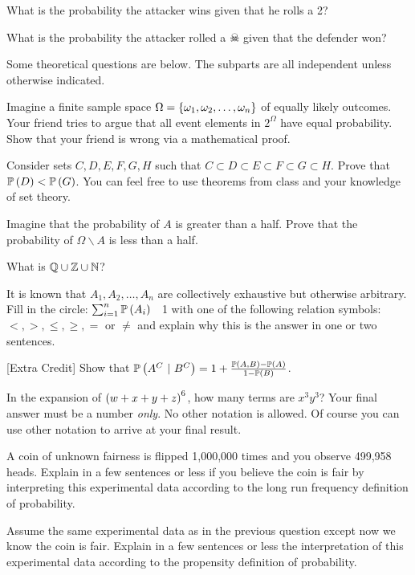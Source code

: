 \documentclass[12pt]{article}
\begin{document}
 What is the probability the attacker wins given that he rolls a 2? 

 What is the probability the attacker rolled a $\skull$ given that the defender won? 

\eenum

\problem Some theoretical questions are below. The subparts are all independent unless otherwise indicated.

\benum

  Imagine a finite sample space $\Omega = \left\{\omega_1, \omega_2, \ldots, \omega_n\right\}$ of equally likely outcomes. Your friend tries to argue that all event elements in $2^\Omega$ have equal probability. Show that your friend is wrong via a mathematical proof. 

  Consider sets $C, D, E, F, G, H$ such that $C \subset D \subset E \subset F \subset G \subset H$. Prove that $\mathbb{P}\left(D\right) < \mathbb{P}\left(G\right)$. You can feel free to use theorems from class and your knowledge of set theory. 

  Imagine that the probability of $A$ is greater than a half. Prove that the probability of $\Omega \backslash A$ is less than a half. 


  What is $\mathbb{Q} \cup \mathbb{Z} \cup \mathbb{N}$? 

 It is known that $A_1, A_2, \ldots, A_n$ are collectively exhaustive but otherwise arbitrary. Fill in the circle: $\sum_{i=1}^n \mathbb{P}\left(A_i\right)$ \textcircled{} 1 with one of the following relation symbols: $<, >, \leq, \geq, =$ or $\neq$ and explain why this is the answer in one or two sentences. 


 [Extra Credit] Show that $\mathbb{P}\left(A^C~|~B^C\right) = 1 + \frac{\mathbb{P}\left(A,B\right) - \mathbb{P}\left(A\right)}{1 - \mathbb{P}\left(B\right)}$. 


  In the expansion of $\left(w + x + y+ z\right)^{6}$, how many terms are $x^3 y^3$? Your final answer must be a number \textit{only}. No other notation is allowed. Of course you can use other notation to arrive at your final result.

  A coin of unknown fairness is flipped 1,000,000 times and you observe 499,958 heads. Explain in a few sentences or less if you believe the coin is fair by interpreting this experimental data according to the long run frequency definition of probability. 

  Assume the same experimental data as in the previous question except now we know the coin is fair. Explain in a few sentences or less the interpretation of this experimental data according to the propensity definition of probability. 

\eenum
\end{document}
